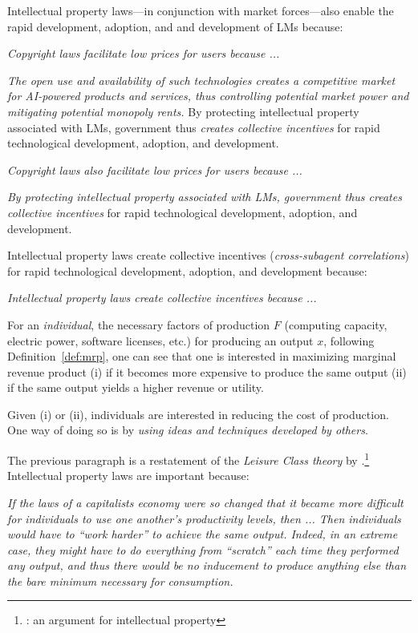 {{Intellectual property laws---in conjunction with market forces---also enable the rapid development, adoption, and and development of LMs because:
\begin{myquotation}
    \emph{Copyright laws facilitate low prices for users because ...}
    \item \emph{The open use and availability of such technologies creates a competitive market for AI-powered products and services, thus controlling potential market power and mitigating potential monopoly rents.} By protecting intellectual property associated with LMs, government thus \emph{creates collective incentives} for rapid technological development, adoption, and development.
    \item \emph{Copyright laws also facilitate low prices for users because ...}
    \item \emph{By protecting intellectual property associated with LMs, government thus creates collective incentives} for rapid technological development, adoption, and development.
\end{myquotation}

Intellectual property laws create collective incentives (\emph{cross-subagent correlations}) for rapid technological development, adoption, and development because:
\begin{myquotation}
    \item \emph{Intellectual property laws create collective incentives because ...}
    \item For an \emph{individual}, the necessary factors of production $F$ (computing capacity, electric power, software licenses, etc.) for producing an output $x$, following Definition~\ref{def:mrp}, one can see that one is interested in maximizing marginal revenue product (i) if it becomes more expensive to produce the same output (ii) if the same output yields a higher revenue or utility.
    \item Given (i) or (ii), individuals are interested in reducing the cost of production. One way of doing so is by \emph{using ideas and techniques developed by others}.
\end{myquotation}

The previous paragraph is a restatement of the \emph{Leisure Class theory} by \citet{rothbard1981economics}.\footnote{\citet{rothbard1898american}: an argument for intellectual property}
Intellectual property laws are important because:
\begin{myquotation}
    \emph{If the laws of a capitalists economy were so changed that it became more difficult for individuals to use one another's productivity levels, then ... Then individuals would have to ``work harder'' to achieve the same output. Indeed, in an extreme case, they might have to do everything from ``scratch'' each time they performed any output, and thus there would be no inducement to produce anything else than the bare minimum necessary for consumption.}
\end{myquotation}

}}
